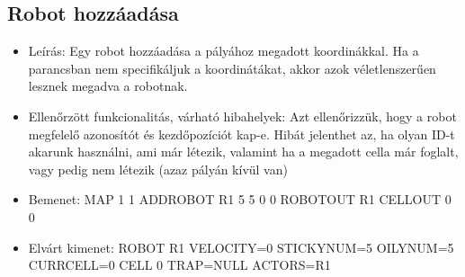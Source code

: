	
\subsection{Robot hozzáadása}
\begin{itemize}
\item Leírás: \newline
Egy robot hozzáadása a pályához megadott koordinákkal. Ha a parancsban nem specifikáljuk a koordinátákat, akkor azok véletlenszerűen lesznek megadva a robotnak.
\item Ellenőrzött funkcionalitás, várható hibahelyek: \newline
Azt ellenőrizzük, hogy a robot megfelelő azonosítót és kezdőpozíciót kap-e. Hibát jelenthet az, ha olyan ID-t akarunk használni, ami már létezik, valamint ha a megadott cella már foglalt, vagy pedig nem létezik (azaz pályán kívül van)
\item Bemenet: \newline
MAP 1 1 \newline
ADDROBOT R1 5 5 0 0 \newline
ROBOTOUT R1 \newline
CELLOUT 0 0
\item Elvárt kimenet: \newline
ROBOT R1 VELOCITY=0 STICKYNUM=5 OILYNUM=5 CURRCELL=0 \newline
CELL 0 TRAP=NULL ACTORS=R1 \newline
\end{itemize}

